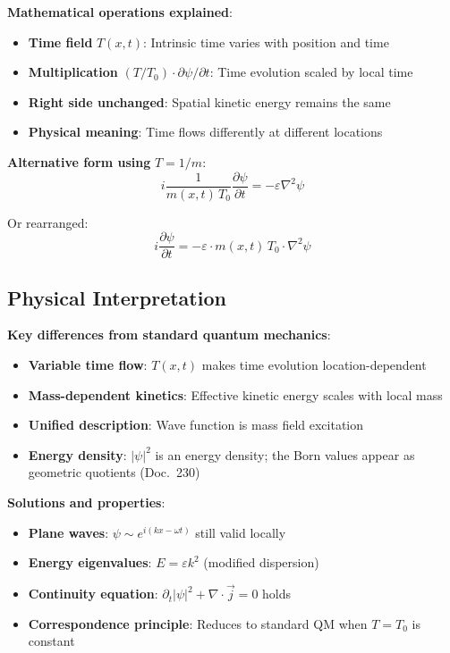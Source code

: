 	\textbf{Mathematical operations explained}:
	\begin{itemize}
		\item \textbf{Time field} $T(x,t)$: Intrinsic time varies with position and time
		\item \textbf{Multiplication} $(T/T_0) \cdot \partial\psi/\partial t$: Time evolution scaled by local time
		\item \textbf{Right side unchanged}: Spatial kinetic energy remains the same
		\item \textbf{Physical meaning}: Time flows differently at different locations
	\end{itemize}
	
	\textbf{Alternative form using} $T = 1/m$:
	\begin{equation}
		i \frac{1}{m(x,t)\,T_0} \frac{\partial\psi}{\partial t} = -\varepsilon \nabla^2 \psi
		\label{eq:t0_schrodinger_mass}
	\end{equation}
	
	Or rearranged:
	\begin{equation}
		i \frac{\partial\psi}{\partial t} = -\varepsilon \cdot m(x,t)\,T_0 \cdot \nabla^2 \psi
		\label{eq:t0_schrodinger_rearranged}
	\end{equation}
	
	\subsection{Physical Interpretation}
	
	\textbf{Key differences from standard quantum mechanics}:
	\begin{itemize}
		\item \textbf{Variable time flow}: $T(x,t)$ makes time evolution location-dependent
		\item \textbf{Mass-dependent kinetics}: Effective kinetic energy scales with local mass
		\item \textbf{Unified description}: Wave function is mass field excitation
		\item \textbf{Energy density}: $|\psi|^2$ is an energy density; the Born values appear as geometric quotients (Doc.~230)
	\end{itemize}
	
	\textbf{Solutions and properties}:
	\begin{itemize}
		\item \textbf{Plane waves}: $\psi \sim e^{i(kx - \omega t)}$ still valid locally
		\item \textbf{Energy eigenvalues}: $E = \varepsilon k^2$ (modified dispersion)
		\item \textbf{Continuity equation}: $\partial_t|\psi|^2 + \nabla \cdot \vec{j} = 0$ holds
		\item \textbf{Correspondence principle}: Reduces to standard QM when $T = T_0$ is constant
	\end{itemize}
	

